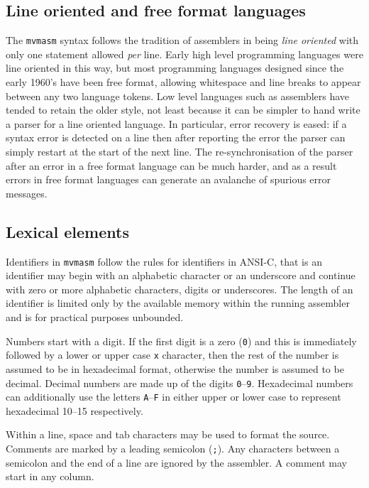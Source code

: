 \subsection{Line oriented and free format languages}
\label{line:oriented}
The {\tt mvmasm} syntax follows the tradition of assemblers in being
{\em line oriented} with only one statement allowed {\em per} line.
Early high level programming languages were line oriented in this way,
but most programming languages designed since the early 1960's  have
been free format, allowing whitespace and line breaks to appear between
any two language tokens. Low level languages such as assemblers have
tended to retain the older style, not least because it can be simpler to
hand write a parser for a line oriented language. In particular,
error recovery is eased: if a syntax error is detected on a line then
after reporting the error the parser can simply restart at the start of
the next line. The re-synchronisation of the parser after an error in a
free format language can be much harder, and as a result errors in free
format languages can generate an avalanche
of spurious error messages.

\subsection{Lexical elements}

Identifiers in {\tt mvmasm} follow the rules for identifiers in ANSI-C,
that is an identifier may begin with an alphabetic character or an
underscore and continue with zero or more alphabetic characters, digits
or underscores. The length of an identifier is limited only by the
available memory within the running assembler and is for practical
purposes unbounded.

Numbers start with a digit. If the first digit is a zero ({\tt 0}) and this is
immediately followed by a lower or upper case {\tt x} character, then
the rest of the number is assumed to be in hexadecimal format, otherwise
the number is assumed to be decimal. Decimal numbers are made up of the
digits {\tt 0}--{\tt 9}. Hexadecimal numbers can additionally use the letters {\tt A}--{\tt F}
in either upper or lower case to represent hexadecimal 10--15
respectively.

Within a line, space and tab characters may be used to format the
source. Comments are marked by a leading semicolon ({\tt ;}). Any
characters between a semicolon and the end of a line are ignored by the
assembler. A comment may start in any column.

